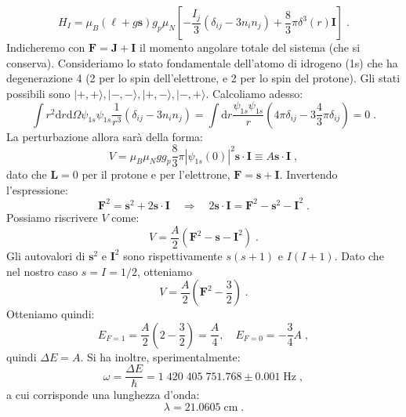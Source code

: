 \documentclass[10pt,a4paper]{report}
\theoremstyle{definition}
\numberwithin{equation}{section}
\newcommand{\diff}[1][]{\mathrm{d}#1}
\newcommand{\ket}{\rangle}
\begin{document}
\begin{equation}
H_I=\mu_B(\boldsymbol{\ell}+g\mathbf{s})g_p\mu_N\left[-\frac{I_j}{3}(\delta_{ij}-3n_in_j)+\frac{8}{3}\pi \delta^3(r)\mathbf{I}\right]\;.
\end{equation}
Indicheremo con $\mathbf{F}=\mathbf{J}+\mathbf{I}$ il momento angolare totale del sistema (che si conserva). Consideriamo lo stato fondamentale dell'atomo di idrogeno (1s) che ha degenerazione 4 (2 per lo spin dell'elettrone, e 2 per lo spin del protone). Gli stati possibili sono $|+,+\ket,|-,-\ket,|+,-\ket,|-,+\ket$. Calcoliamo adesso:
$$
\int r^2\diff{r}\diff{\Omega}\psi_{1s}\psi_{1s}\frac{1}{r^3}(\delta_{ij}-3n_in_j)=\int \diff{r}\frac{\psi_{1s}\psi_{1s}}{r}\left(4\pi\delta_{ij}-3\frac{4}{3}\pi\delta_{ij}\right)=0\;.
$$
La perturbazione allora sarà della forma:
\begin{equation}
V=\mu_B\mu_Ngg_p\frac{8}{3}\pi|\psi_{1s}(0)|^2\mathbf{s}\cdot\mathbf{I}\equiv A \mathbf{s}\cdot\mathbf{I}\;,
\end{equation}
dato che $\mathbf{L}=0$ per il protone e per l'elettrone, $\mathbf{F}=\mathbf{s}+\mathbf{I}$. Invertendo l'espressione:
\begin{equation}
\mathbf{F}^2=\mathbf{s}^2+2\mathbf{s}\cdot\mathbf{I}\quad \Longrightarrow\quad 2\mathbf{s}\cdot\mathbf{I}=\mathbf{F}^2-\mathbf{s}^2-\mathbf{I}^2\;.
\end{equation}
Possiamo riscrivere $V$ come:
$$
V=\frac{A}{2}(\mathbf{F}^2-\mathbf{s}-\mathbf{I}^2)\;.
$$
Gli autovalori di $\mathbf{s}^2$ e $\mathbf{I}^2$ sono rispettivamente $s(s+1)$ e $I(I+1)$. Dato che nel nostro caso $s=I=1/2$, otteniamo
\begin{equation}
V=\frac{A}{2}\left(\mathbf{F}^2-\frac{3}{2}\right)\;.
\end{equation}
Otteniamo quindi:
\begin{equation}
E_{F=1}=\frac{A}{2}\left(2-\frac{3}{2}\right)=\frac{A}{4}, \quad E_{F=0}=-\frac{3}{4}A\;,
\end{equation}
quindi $\Delta E=A$. Si ha inoltre, sperimentalmente:
\begin{equation}
\omega=\frac{\Delta E}{\hbar}=1\;420\;405\;751.768\pm 0.001\;\mbox{Hz}\;,
\end{equation}
a cui corrisponde una lunghezza d'onda:
\begin{equation}
\lambda=21.0605\;\mbox{cm}\;.
\end{equation}
\end{document}
